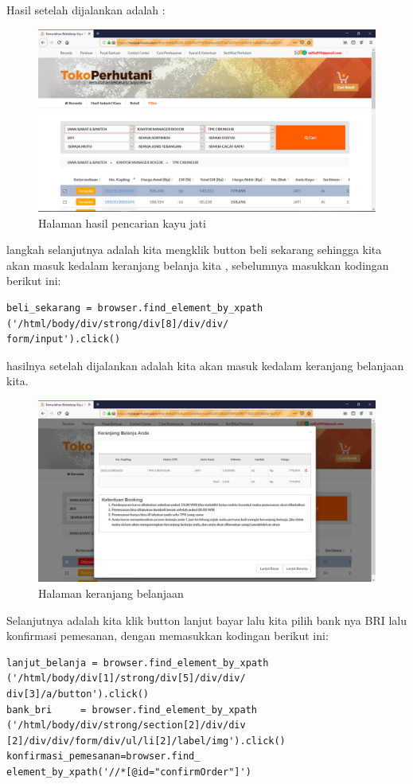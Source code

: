 Hasil setelah dijalankan adalah : 
\begin{figure}[h]
	\centering
	\includegraphics[scale=0.25]{figures/carikayu1}
	\caption{Halaman hasil pencarian kayu jati}
\end{figure}

\newpage
langkah selanjutnya adalah kita mengklik button beli sekarang sehingga kita akan masuk kedalam keranjang belanja kita , sebelumnya masukkan kodingan berikut ini: 
\begin{verbatim}
beli_sekarang = browser.find_element_by_xpath
('/html/body/div/strong/div[8]/div/div/
form/input').click()
\end{verbatim}

hasilnya setelah dijalankan adalah kita akan masuk kedalam keranjang belanjaan kita.
\begin{figure}[h]
	\centering
	\includegraphics[scale=0.25]{figures/carikayu2}
	\caption{Halaman keranjang belanjaan}
\end{figure}

Selanjutnya adalah kita klik button lanjut bayar lalu kita pilih bank nya BRI lalu konfirmasi pemesanan, dengan memasukkan kodingan berikut ini: 
\begin{verbatim}
lanjut_belanja = browser.find_element_by_xpath
('/html/body/div[1]/strong/div[5]/div/div/
div[3]/a/button').click()
bank_bri     = browser.find_element_by_xpath
('/html/body/div/strong/section[2]/div/div
[2]/div/div/form/div/ul/li[2]/label/img').click()
konfirmasi_pemesanan=browser.find_
element_by_xpath('//*[@id="confirmOrder"]')
\end{verbatim}

